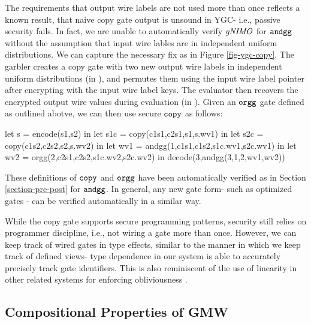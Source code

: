 The requirements that output wire labels are not used more than once
reflects a known result, that naive copy gate output is unsound in
YGC- i.e., passive security fails. In fact, we are unable to
automatically verify $\mathit{gNIMO}$ for $\texttt{andgg}$ without the assumption
that input wire lables are in independent uniform distributions. We
can capture the necessary fix as in Figure \ref{fig-ygc-copy}. The
garbler creates a copy gate with two new output wire labels in
independent uniform distributions (in ), and permutes
them using the input wire label pointer after encrypting with the
input wire label keys. The evaluator then recovers the encrypted
output wire values during evaluation (in ). Given an
$\texttt{orgg}$ gate defined as outlined abotve, we can then use
secure $\texttt{copy}$ as follows: 
\begin{verbatimtab}
  let s = encode(s1,s2) in
  let s1c = copy(c1s1,c2s1,s1,s.wv1) in
  let s2c = copy(c1s2,c2s2,s2,s.wv2) in
  let wv1 = andgg(1,c1s1,c1s2,s1c.wv1,s2c.wv1) in
  let wv2 = orgg(2,c2s1,c2s2,s1c.wv2,s2c.wv2) in
  decode(3,andgg(3,1,2,wv1,wv2))
\end{verbatimtab}
These definitions of $\texttt{copy}$ and $\texttt{orgg}$ have been
automatically verified as in Section \ref{section-pre-post} for
$\texttt{andgg}$. In general, any new gate form- such as optimized gates
\cite{XXX}- can be verified automatically in a similar way.

While the copy gate supports secure programming patterns, security
still relies on programmer discipline, i.e., not wiring a gate more
than once. However, we can keep track of wired gates in type effects,
similar to the manner in which we keep track of defined views- type
dependence in our system is able to accurately precisely track
gate identifiers. This is also reminiscent of the use of linearity
in other related systems for enforcing obliviousness \cite{darais2019language}. 

\subsection{Compositional Properties of GMW}



